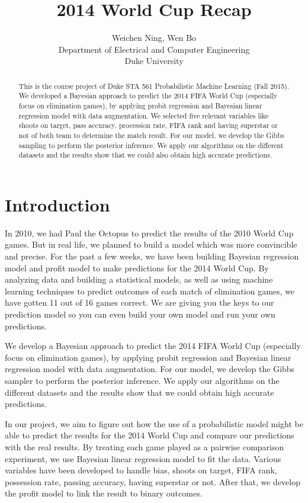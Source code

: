 \documentclass{article}
\title{2014 World Cup Recap}
\author{
Weichen Ning, Wen Bo\\
Department of Electrical and Computer Engineering\\
Duke University}
\begin{document}

\maketitle

\begin{abstract}

This is the course project of Duke STA 561 Probabilistic Machine Learning (Fall 2015). We developed a Bayesian approach to predict the 2014 FIFA World Cup (especially focus on elimination games), by applying probit regression and Bayesian linear regression model with data augmentation. We selected five relevant variables like shoots on target, pass accuracy, procession rate, FIFA rank and having superstar or not of both team to determine the match result. For our model, we develop the Gibbs sampling to perform the posterior inference. We apply our algorithms on the different datasets and the results show that we could also obtain high accurate predictions.

\end{abstract}

\section{Introduction}

In 2010, we had Paul the Octopus to predict the results of the 2010 World Cup games. But in real life, we planned to build a model which was more convincible and precise. For the past a few weeks, we have been building Bayesian regression model and profit model to make predictions for the 2014 World Cup. By analyzing data and building a statistical models, as well as using machine learning techniques to predict outcomes of each match of elimination games, we have gotten 11 out of 16 games correct. We are giving you the keys to our prediction model so you can even build your own model and run your own predictions.

We develop a Bayesian approach to predict the 2014 FIFA World Cup (especially focus on elimination games), by applying probit regression and Bayesian linear regression model with data augmentation. For our model, we develop the Gibbs sampler to perform the posterior inference. We apply our algorithms on the different datasets and the results show that we could obtain high accurate predictions.

In our project, we aim to figure out how the use of a probabilistic model might be able to predict the results for the 2014 World Cup and compare our predictions with the real results. By treating each game played as a pairwise comparison experiment, we use Bayesian linear regression model to fit the data. Various variables have been developed to handle bias, shoots on target, FIFA rank, possession rate, passing accuracy, having superstar or not. After that, we develop the profit model to link the result to binary outcomes. 
\end{document}
